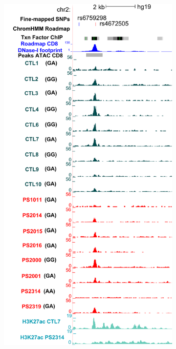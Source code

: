 \begin{figure}[htbp]
\begin{subfigure}[b]{0.45\textwidth}
\includegraphics[width=\textwidth]{./Results2/pdfs/chr2p15_rs4672505_FM_CD8_track_all_marks}
\caption{\textbf{}}
\end{subfigure}

\end{figure}
